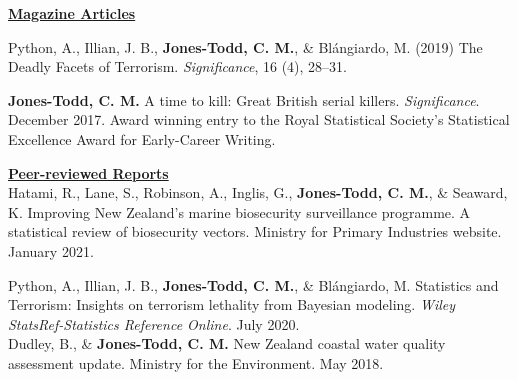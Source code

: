\documentclass[10pt,a4paper]{moderncv}
\begin{document}



 
 
\underline{\textbf{Magazine Articles}}\\

\vspace{-3pt}

Python, A.,  Illian, J. B., \textbf{Jones-Todd, C. M.}, \& Bl\'{a}ngiardo, M. (2019) The Deadly Facets of Terrorism. \textit{Significance}, 16 (4), 28--31.\\

\vspace{-3pt}

\textbf{Jones-Todd, C. M.} A time to kill: Great British serial killers. \textit{Significance}. December 2017. Award winning entry to the Royal Statistical Society's Statistical Excellence Award for Early-Career Writing.\\

\vspace{2pt} 

\underline{\textbf{Peer-reviewed Reports}}\\

Hatami, R., Lane, S., Robinson, A.,  Inglis, G.,  \textbf{Jones-Todd, C. M.}, \& Seaward, K. Improving New Zealand’s marine biosecurity surveillance programme. A statistical review of biosecurity vectors.  Ministry for Primary Industries website. January 2021.\\

\vspace{-3pt}

Python, A.,  Illian, J. B., \textbf{Jones-Todd, C. M.}, \& Bl\'{a}ngiardo, M. Statistics and Terrorism: Insights on terrorism lethality from Bayesian modeling. \textit{Wiley StatsRef-Statistics Reference Online}. July 2020.\\

Dudley, B., \& \textbf{Jones-Todd, C. M.} New Zealand coastal water quality assessment update. Ministry for the Environment. May 2018.\\

\vspace{-3pt}
\end{document}
